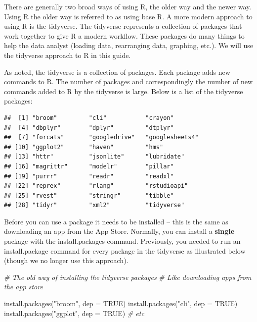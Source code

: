 \documentclass[
]{krantz}
\makeatletter
\newenvironment{Shaded}{\begin{snugshade}}{\end{snugshade}}
\newcommand{\AttributeTok}[1]{\textcolor[rgb]{0.61,0.61,0.61}{#1}}
\newcommand{\CommentTok}[1]{\textcolor[rgb]{0.37,0.37,0.37}{\textit{#1}}}
\newcommand{\ConstantTok}[1]{\textcolor[rgb]{0,0,0}{#1}}
\newcommand{\FunctionTok}[1]{\textcolor[rgb]{0,0,0}{#1}}
\newcommand{\NormalTok}[1]{#1}
\newcommand{\StringTok}[1]{\textcolor[rgb]{0.5,0.5,0.5}{#1}}
\newenvironment{kframe}{%
\medskip{}
\setlength{\fboxsep}{.8em}
 \def\at@end@of@kframe{}%
 \ifinner\ifhmode%
  \def\at@end@of@kframe{\end{minipage}}%
  \begin{minipage}{\columnwidth}%
 \fi\fi%
 \def\FrameCommand##1{\hskip\@totalleftmargin \hskip-\fboxsep
 \colorbox{shadecolor}{##1}\hskip-\fboxsep
     \hskip-\linewidth \hskip-\@totalleftmargin \hskip\columnwidth}%
 \MakeFramed {\advance\hsize-\width
   \@totalleftmargin\z@ \linewidth\hsize
   \@setminipage}}%
 {\par\unskip\endMakeFramed%
 \at@end@of@kframe}
\renewenvironment{Shaded}{\begin{kframe}}{\end{kframe}}
\makeatother
\begin{document}
There are generally two broad ways of using R, the older way and the newer way. Using R the older way is referred to as using base R. A more modern approach to using R is the tidyverse. The tidyverse represents a collection of packages that work together to give R a modern workflow. These packages do many things to help the data analyst (loading data, rearranging data, graphing, etc.). We will use the tidyverse approach to R in this guide.

As noted, the tidyverse is a collection of packages. Each package adds new commands to R. The number of packages and correspondingly the number of new commands added to R by the tidyverse is large. Below is a list of the tidyverse packages:

\begin{verbatim}
##  [1] "broom"         "cli"           "crayon"       
##  [4] "dbplyr"        "dplyr"         "dtplyr"       
##  [7] "forcats"       "googledrive"   "googlesheets4"
## [10] "ggplot2"       "haven"         "hms"          
## [13] "httr"          "jsonlite"      "lubridate"    
## [16] "magrittr"      "modelr"        "pillar"       
## [19] "purrr"         "readr"         "readxl"       
## [22] "reprex"        "rlang"         "rstudioapi"   
## [25] "rvest"         "stringr"       "tibble"       
## [28] "tidyr"         "xml2"          "tidyverse"
\end{verbatim}

Before you can use a package it needs to be installed -- this is the same as downloading an app from the App Store. Normally, you can install a \textbf{single} package with the install.packages command. Previously, you needed to run an install.package command for every package in the tidyverse as illustrated below (though we no longer use this approach).

\begin{Shaded}
\begin{Highlighting}[]
\CommentTok{\# The old way of installing the tidyverse packages}
\CommentTok{\# Like downloading apps from the app store}

\FunctionTok{install.packages}\NormalTok{(}\StringTok{"broom"}\NormalTok{, }\AttributeTok{dep =} \ConstantTok{TRUE}\NormalTok{)}
\FunctionTok{install.packages}\NormalTok{(}\StringTok{"cli"}\NormalTok{, }\AttributeTok{dep =} \ConstantTok{TRUE}\NormalTok{)}
\FunctionTok{install.packages}\NormalTok{(}\StringTok{"ggplot"}\NormalTok{, }\AttributeTok{dep =} \ConstantTok{TRUE}\NormalTok{)}
\CommentTok{\# etc}
\end{Highlighting}
\end{Shaded}
\end{document}
